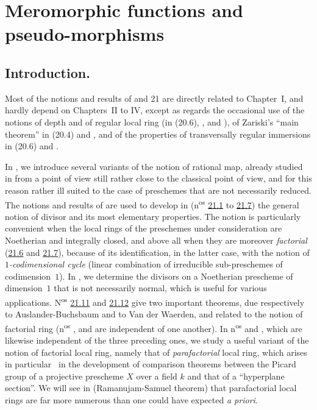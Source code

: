 \section{Meromorphic functions and pseudo-morphisms}

\setcounter{subsection}{-1}
\subsection{Introduction.}

Most of the notions and results of \textsection{} and 21 are directly related to Chapter~I, and hardly depend on Chapters~II to IV, except as regards the occasional use of the notions of depth and of regular local ring (in (20.6), ,  and ), of Zariski's ``main theorem'' in (20.4) and , and of the properties of transversally regular immersions in (20.6) and .

In , we introduce several variants of the notion of rational map, already studied in  from a point of view still rather close to the classical point of view, and for this reason rather ill suited to the case of preschemes that are not necessarily reduced.
The notions and results of  are used to develop in  (n\textsuperscript{os} \hyperref[IV.21.1]{21.1} to \hyperref[IV.21.7]{21.7}) the general notion of divisor and its most elementary properties.
The notion is particularly convenient when the local rings of the preschemes under consideration are Noetherian and integrally closed, and above all when they are moreover \emph{factorial} (\hyperref[IV.21.6]{21.6} and \hyperref[IV.21.7]{21.7}), because of its identification, in the latter case, with the notion of \emph{$1$-codimensional cycle} (linear combination of irreducible sub-preschemes of codimension~$1$).
In , we determine the divisors on a Noetherian prescheme of dimension~$1$ that is not necessarily normal, which is useful for various applications.
N\textsuperscript{os} \hyperref[IV.21.11]{21.11} and \hyperref[IV.21.12]{21.12} give two important theorems, due respectively to Auslander-Buchsbaum and to Van der Waerden, and related to the notion of factorial ring (n\textsuperscript{os} ,  and  are independent of one another).
In n\textsuperscript{os}  and , which are likewise independent of the three preceding ones, we study a useful variant of the notion of factorial local ring, namely that of \emph{parafactorial} local ring, which arises in particular~\cite{IV-41} in the development of comparison theorems between the Picard group of a projective prescheme $X$ over a field $k$ and that of a ``hyperplane section''.
We will see in  (Ramanujam-Samuel theorem) that parafactorial local rings are far more numerous than one could have expected \emph{a priori}.

